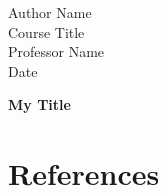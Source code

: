 \documentclass[12pt]{article}
\newcommand{\titletext}[1]
{\begin{center}
		\textbf{#1}
\end{center}}
\newcommand{\headertext}[4]
{\begin{flushleft}
		#1
		\\ #2
		\\ #3
		\\ #4
\end{flushleft}}
\newenvironment{references}{%
	\begin{hangparas}{0.5in}{1}
	}{%
		\\ \end{hangparas}%
}
\begin{document}
\headertext{Author Name}{Course Title}{Professor Name}{Date}

\titletext{My Title}

\section{References}
\begin{references}
\end{references}
	
\end{document}
